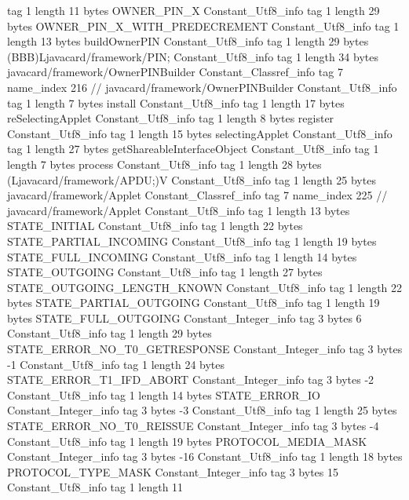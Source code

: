 {{{			tag	1
			length	11
			bytes	OWNER_PIN_X
		}
		Constant_Utf8_info {
			tag	1
			length	29
			bytes	OWNER_PIN_X_WITH_PREDECREMENT
		}
		Constant_Utf8_info {
			tag	1
			length	13
			bytes	buildOwnerPIN
		}
		Constant_Utf8_info {
			tag	1
			length	29
			bytes	(BBB)Ljavacard/framework/PIN;
		}
		Constant_Utf8_info {
			tag	1
			length	34
			bytes	javacard/framework/OwnerPINBuilder
		}
		Constant_Classref_info {
			tag	7
			name_index	216		// javacard/framework/OwnerPINBuilder
		}
		Constant_Utf8_info {
			tag	1
			length	7
			bytes	install
		}
		Constant_Utf8_info {
			tag	1
			length	17
			bytes	reSelectingApplet
		}
		Constant_Utf8_info {
			tag	1
			length	8
			bytes	register
		}
		Constant_Utf8_info {
			tag	1
			length	15
			bytes	selectingApplet
		}
		Constant_Utf8_info {
			tag	1
			length	27
			bytes	getShareableInterfaceObject
		}
		Constant_Utf8_info {
			tag	1
			length	7
			bytes	process
		}
		Constant_Utf8_info {
			tag	1
			length	28
			bytes	(Ljavacard/framework/APDU;)V
		}
		Constant_Utf8_info {
			tag	1
			length	25
			bytes	javacard/framework/Applet
		}
		Constant_Classref_info {
			tag	7
			name_index	225		// javacard/framework/Applet
		}
		Constant_Utf8_info {
			tag	1
			length	13
			bytes	STATE_INITIAL
		}
		Constant_Utf8_info {
			tag	1
			length	22
			bytes	STATE_PARTIAL_INCOMING
		}
		Constant_Utf8_info {
			tag	1
			length	19
			bytes	STATE_FULL_INCOMING
		}
		Constant_Utf8_info {
			tag	1
			length	14
			bytes	STATE_OUTGOING
		}
		Constant_Utf8_info {
			tag	1
			length	27
			bytes	STATE_OUTGOING_LENGTH_KNOWN
		}
		Constant_Utf8_info {
			tag	1
			length	22
			bytes	STATE_PARTIAL_OUTGOING
		}
		Constant_Utf8_info {
			tag	1
			length	19
			bytes	STATE_FULL_OUTGOING
		}
		Constant_Integer_info {
			tag	3
			bytes	6
		}
		Constant_Utf8_info {
			tag	1
			length	29
			bytes	STATE_ERROR_NO_T0_GETRESPONSE
		}
		Constant_Integer_info {
			tag	3
			bytes	-1
		}
		Constant_Utf8_info {
			tag	1
			length	24
			bytes	STATE_ERROR_T1_IFD_ABORT
		}
		Constant_Integer_info {
			tag	3
			bytes	-2
		}
		Constant_Utf8_info {
			tag	1
			length	14
			bytes	STATE_ERROR_IO
		}
		Constant_Integer_info {
			tag	3
			bytes	-3
		}
		Constant_Utf8_info {
			tag	1
			length	25
			bytes	STATE_ERROR_NO_T0_REISSUE
		}
		Constant_Integer_info {
			tag	3
			bytes	-4
		}
		Constant_Utf8_info {
			tag	1
			length	19
			bytes	PROTOCOL_MEDIA_MASK
		}
		Constant_Integer_info {
			tag	3
			bytes	-16
		}
		Constant_Utf8_info {
			tag	1
			length	18
			bytes	PROTOCOL_TYPE_MASK
		}
		Constant_Integer_info {
			tag	3
			bytes	15
		}
		Constant_Utf8_info {
			tag	1
			length	11
}}}
